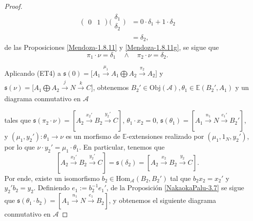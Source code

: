 \documentclass[tesis]{subfiles}
\begin{document}
\begin{proof}
\begin{align*}
        (\begin{smallmatrix} 0 &1 \end{smallmatrix})\big( \begin{smallmatrix} \delta_1 \\ \delta_2 \end{smallmatrix}\big) &= 0\cdot\delta_1 + 1\cdot\delta_2 \\
                               &= \delta_2,
    \end{align*}
    de las Proposiciones \ref{Mendoza-1.8.11} y \ref{Mendoza-1.8.11g}, se sigue que
    \begin{equation}\label{eq: 3.15_1}
        \pi_1\cdot\nu = \delta_1 \quad \land \quad \pi_2\cdot\nu = \delta_2.
    \end{equation}

    Aplicando (ET4) a $\mathfrak{s}(0) = \big[A_1\xrightarrow[]{\mu_1}A_1\bigoplus A_2\xrightarrow[]{\pi_2}A_2\big]$ y $\mathfrak{s}(\nu) = \big[A_1\bigoplus A_2\xrightarrow[]{j}N\xrightarrow[]{k}C\big]$, obtenemos $B_2'\in\text{Obj}(\mathscr{A}), \theta_1\in\mathbb{E}(B_2',A_1)$ y un diagrama conmutativo en $\mathscr{A}$
    \begin{center}
    \end{center}
    tales que  $\mathfrak{s}(\pi_2\cdot\nu) = [A_2\xrightarrow[]{x_2'}B_2\xrightarrow[]{y_2'}C]$, $\theta_1\cdot x_2 = 0$, $\mathfrak{s}(\theta_1) = [A_1\xrightarrow[]{n_1}N\xrightarrow[]{e_1'}B_2']$, y $(\mu_1,y_2'):\theta_1\to \nu$ es un morfismo de $\mathbb{E}$-extensiones realizado por $(\mu_1,1_N,y_2')$, por lo que $\nu\cdot y_2' = \mu_1\cdot\theta_1$. En particular, tenemos que
    \[
        [A_2 \xrightarrow[]{x_2'} B_2\xrightarrow[]{y_2'} C] = \mathfrak{s}(\delta_2) = [A_2\xrightarrow[]{x_2} B_2\xrightarrow[]{y_2} C].
    \] 
    Por ende, existe un isomorfismo $b_2\in\text{Hom}_\mathscr{A}(B_2,B_2')$ tal que $b_2x_2=x_2'$ y $y_2'b_2=y_2$. Definiendo $e_1 := b_2^{-1} e_1'$, de la Proposición \ref{NakaokaPalu-3.7} se sigue que $\mathfrak{s}(\theta_1\cdot b_2) = [A_1\xrightarrow[]{n_1}N\xrightarrow[]{e_1}B_2]$, y obtenemos el siguiente diagrama conmutativo en $\mathscr{A}$

\end{proof}
\end{document}
